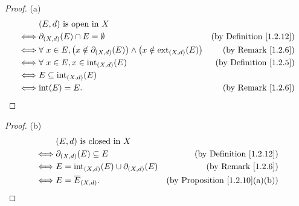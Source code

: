 \begin{proof}{(a)}
    \begin{align*}
             & (E, d) \text{ is open in } X                                                                                                                    \\
        \iff & \partial_{(X, d)}(E) \cap E = \emptyset                                                                   & \text{(by Definition \ref{1.2.12})} \\
        \iff & \forall\ x \in E, \big(x \notin \partial_{(X, d)}(E)\big) \land \big(x \notin \text{ext}_{(X, d)}(E)\big) & \text{(by Remark \ref{1.2.6})}      \\
        \iff & \forall\ x \in E, x \in \text{int}_{(X, d)}(E)                                                            & \text{(by Definition \ref{1.2.5})}  \\
        \iff & E \subseteq \text{int}_{(X, d)}(E)                                                                                                              \\
        \iff & \text{int}(E) = E.                                                                                        & \text{(by Remark \ref{1.2.6})}
    \end{align*}
\end{proof}

\begin{proof}{(b)}
    \begin{align*}
             & (E, d) \text{ is closed in } X                                                                    \\
        \iff & \partial_{(X, d)}(E) \subseteq E                     & \text{(by Definition \ref{1.2.12})}        \\
        \iff & E = \text{int}_{(X, d)}(E) \cup \partial_{(X, d)}(E) & \text{(by Remark \ref{1.2.6})}             \\
        \iff & E = \overline{E}_{(X, d)}.                           & \text{(by Proposition \ref{1.2.10}(a)(b))}
    \end{align*}
\end{proof}

